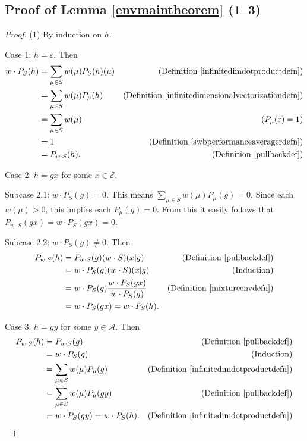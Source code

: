\documentclass[twoside]{article}
\begin{document}
\subsection{Proof of Lemma \ref{envmaintheorem} (1--3)}
\begin{proof}
    (1) By induction on $h$.

    Case 1: $h=\varepsilon$. Then
    \begin{align*}
        w\cdot P_{S}(h)
        &= \sum_{\mu\in S}w(\mu)P_{S}(h)(\mu)
            &\mbox{(Definition \ref{infinitedimdotproductdefn})}\\
        &= \sum_{\mu\in S}w(\mu)P_\mu(h)
            &\mbox{(Definition \ref{infinitedimensionalvectorizationdefn})}\\
        &= \sum_{\mu\in S}w(\mu)
            &\mbox{($P_\mu(\varepsilon)=1$)}\\
        &= 1
            &\mbox{(Definition \ref{swbperformanceaveragerdefn})}\\
        &= P_{w\cdot S}(h).
            &\mbox{(Definition \ref{pullbackdef})}
    \end{align*}

    Case 2: $h=gx$ for some $x\in\mathcal E$.

    Subcase 2.1: $w\cdot P_{S}(g)=0$.
        This means $\sum_{\mu\in S}w(\mu)P_\mu(g)=0$.
        Since each $w(\mu)>0$, this implies each $P_\mu(g)=0$.
        From this it easily follows that
        $P_{w\cdot S}(gx)=w\cdot P_{S}(gx)=0$.

    Subcase 2.2: $w\cdot P_{S}(g)\not=0$. Then
    \begin{align*}
        P_{w\cdot S}(h)
            &= P_{w\cdot S}(g)(w\cdot S)(x|g)
                &\mbox{(Definition \ref{pullbackdef})}\\
            &= w\cdot P_{S}(g)(w\cdot S)(x|g)
                &\mbox{(Induction)}\\
            &= w\cdot P_{S}(g)\frac{w\cdot P_{S}(gx)}{w\cdot P_{S}(g)}
                &\mbox{(Definition \ref{mixtureenvdefn})}\\
            &= w\cdot P_{S}(gx) = w\cdot P_{S}(h).
    \end{align*}

    Case 3: $h=gy$ for some $y\in\mathcal A$.
    Then
    \begin{align*}
        P_{w\cdot S}(h)
            &= P_{w\cdot S}(g)
                &\mbox{(Definition \ref{pullbackdef})}\\
            &= w\cdot P_{S}(g)
                &\mbox{(Induction)}\\
            &= \sum_{\mu\in S} w(\mu)P_\mu(g)
                &\mbox{(Definition \ref{infinitedimdotproductdefn})}\\
            &= \sum_{\mu\in S} w(\mu)P_\mu(gy)
                &\mbox{(Definition \ref{pullbackdef})}\\
            &= w\cdot P_{S}(gy) = w\cdot P_{S}(h).
                &\mbox{(Definition \ref{infinitedimdotproductdefn})}
    \end{align*}


\end{proof}
\end{document}
